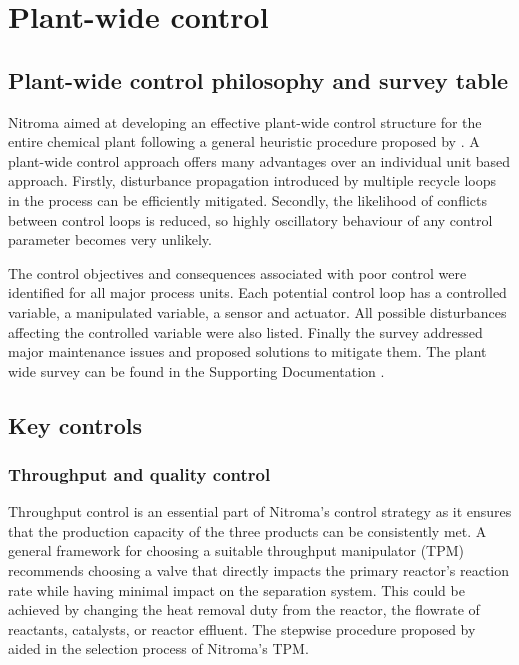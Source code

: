 \section{Plant-wide control}


\subsection{Plant-wide control philosophy and survey table} %

Nitroma aimed at developing an effective plant-wide control structure for the entire chemical plant following a general heuristic procedure proposed by \textcite{}. A plant-wide control approach offers many advantages over an individual unit based approach. Firstly, disturbance propagation introduced by multiple recycle loops in the process can be efficiently mitigated. Secondly, the likelihood of conflicts between control loops is reduced, so highly oscillatory behaviour of any control parameter becomes very unlikely. 

The control objectives and consequences associated with poor control were identified for all major process units. Each potential control loop has a controlled variable, a manipulated variable, a sensor and actuator. All possible disturbances affecting the controlled variable were also listed. Finally the survey addressed major maintenance issues and proposed solutions to mitigate them. The plant wide survey can be found in the Supporting Documentation .


\subsection{Key controls}

\subsubsection{Throughput and quality control} %
Throughput control is an essential part of Nitroma's control strategy as it ensures that the production capacity of the three products can be consistently met. A general framework for choosing a suitable throughput manipulator (TPM) recommends choosing a valve that directly impacts the primary reactor's reaction rate while having minimal impact on the separation system. This could be achieved by changing the heat removal duty from the reactor, the flowrate of reactants, catalysts, or reactor effluent. The stepwise procedure proposed by \textcite{} aided in the selection process of Nitroma's TPM. 

